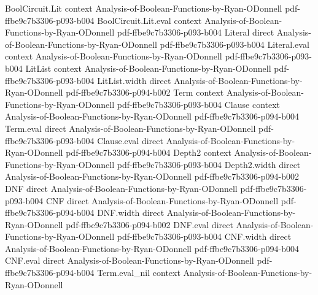 \begin{lemma}
\label{BoolBLR.triple_expectation_as_convolution}
\leanok
{}
\proofstep
  {BoolCircuit.Lit}
  {context}
  {Analysis-of-Boolean-Functions-by-Ryan-ODonnell}
  {pdf-ffbe9c7b3306-p093-b004}
\proofstep
  {BoolCircuit.Lit.eval}
  {context}
  {Analysis-of-Boolean-Functions-by-Ryan-ODonnell}
  {pdf-ffbe9c7b3306-p093-b004}
\proofstep
  {Literal}
  {direct}
  {Analysis-of-Boolean-Functions-by-Ryan-ODonnell}
  {pdf-ffbe9c7b3306-p093-b004}
\proofstep
  {Literal.eval}
  {context}
  {Analysis-of-Boolean-Functions-by-Ryan-ODonnell}
  {pdf-ffbe9c7b3306-p093-b004}
\proofstep
  {LitList}
  {context}
  {Analysis-of-Boolean-Functions-by-Ryan-ODonnell}
  {pdf-ffbe9c7b3306-p093-b004}
\proofstep
  {LitList.width}
  {direct}
  {Analysis-of-Boolean-Functions-by-Ryan-ODonnell}
  {pdf-ffbe9c7b3306-p094-b002}
\proofstep
  {Term}
  {context}
  {Analysis-of-Boolean-Functions-by-Ryan-ODonnell}
  {pdf-ffbe9c7b3306-p093-b004}
\proofstep
  {Clause}
  {context}
  {Analysis-of-Boolean-Functions-by-Ryan-ODonnell}
  {pdf-ffbe9c7b3306-p094-b004}
\proofstep
  {Term.eval}
  {direct}
  {Analysis-of-Boolean-Functions-by-Ryan-ODonnell}
  {pdf-ffbe9c7b3306-p093-b004}
\proofstep
  {Clause.eval}
  {direct}
  {Analysis-of-Boolean-Functions-by-Ryan-ODonnell}
  {pdf-ffbe9c7b3306-p094-b004}
\proofstep
  {Depth2}
  {context}
  {Analysis-of-Boolean-Functions-by-Ryan-ODonnell}
  {pdf-ffbe9c7b3306-p093-b004}
\proofstep
  {Depth2.width}
  {direct}
  {Analysis-of-Boolean-Functions-by-Ryan-ODonnell}
  {pdf-ffbe9c7b3306-p094-b002}
\proofstep
  {DNF}
  {direct}
  {Analysis-of-Boolean-Functions-by-Ryan-ODonnell}
  {pdf-ffbe9c7b3306-p093-b004}
\proofstep
  {CNF}
  {direct}
  {Analysis-of-Boolean-Functions-by-Ryan-ODonnell}
  {pdf-ffbe9c7b3306-p094-b004}
\proofstep
  {DNF.width}
  {direct}
  {Analysis-of-Boolean-Functions-by-Ryan-ODonnell}
  {pdf-ffbe9c7b3306-p094-b002}
\proofstep
  {DNF.eval}
  {direct}
  {Analysis-of-Boolean-Functions-by-Ryan-ODonnell}
  {pdf-ffbe9c7b3306-p093-b004}
\proofstep
  {CNF.width}
  {direct}
  {Analysis-of-Boolean-Functions-by-Ryan-ODonnell}
  {pdf-ffbe9c7b3306-p094-b004}
\proofstep
  {CNF.eval}
  {direct}
  {Analysis-of-Boolean-Functions-by-Ryan-ODonnell}
  {pdf-ffbe9c7b3306-p094-b004}
\proofstep
  {Term.eval_nil}
  {context}
  {Analysis-of-Boolean-Functions-by-Ryan-ODonnell}

\end{lemma}
